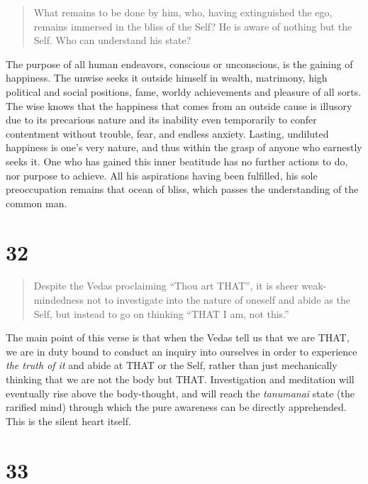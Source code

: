 \documentclass[12pt]{report}
\begin{document}
\begin{quote}
  What remains to be done by him, who, having extinguished the ego,
  remains immersed in the bliss of the Self? He is aware of nothing
  but the Self. Who can understand his state?
\end{quote}


The purpose of all human endeavors, conscious or unconscious, is the
gaining of happiness. The unwise seeks it outside himself in wealth,
matrimony, high political and social positions, fame, worldy
achievements and pleasure of all sorts. The wise knows that the
happiness that comes from an outside cause is illusory due to its
precarious nature and its inability even temporarily to confer
contentment without trouble, fear, and endless anxiety. Lasting,
undiluted happiness is one's very nature, and thus within the grasp of
anyone who earnestly seeks it. One who has gained this inner beatitude
has no further actions to do, nor purpose to achieve. All his
aspirations having been fulfilled, his sole preoccupation remains that
ocean of bliss, which passes the understanding of the common man.

\section{32}

\begin{quote}
  Despite the Vedas proclaiming ``Thou art THAT'', it is sheer
  weak-mindedness not to investigate into the nature of oneself and
  abide as the Self, but instead to go on thinking ``THAT I am, not
  this.'' 
\end{quote}


The main point of this verse is that when the Vedas tell us that we
are THAT, we are in duty bound to conduct an inquiry into ourselves in
order to experience \emph{the truth of it} and abide at THAT or the
Self, rather than just mechanically thinking that we are not the body
but THAT. Investigation and meditation will eventually rise above the
body-thought, and will reach the \emph{tanumanai} state (the rarified
mind) through which the pure awareness can be directly
apprehended. This is the silent heart itself.

\section{33}
\end{document}
